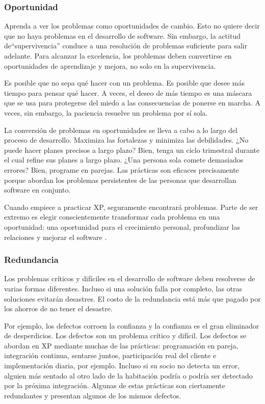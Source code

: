 \begin{spacing}{1.5}
		\subsubsection{Oportunidad}
			Aprenda a ver los problemas como oportunidades de cambio. Esto no quiere decir que no haya problemas en el desarrollo de software. Sin embargo, la actitud de``supervivencia'' conduce a una resolución de problemas suficiente para salir adelante. Para alcanzar la excelencia, los problemas deben convertirse en oportunidades de aprendizaje y mejora, no solo en la supervivencia.
			
			Es posible que no sepa qué hacer con un problema. Es posible que desee más tiempo para pensar qué hacer. A veces, el deseo de más tiempo es una máscara que se usa para protegerse del miedo a las consecuencias de ponerse en marcha. A veces, sin embargo, la paciencia resuelve un problema por sí sola.
			
			La conversión de problemas en oportunidades se lleva a cabo a lo largo del proceso de desarrollo. Maximiza las fortalezas y minimiza las debilidades. ¿No puede hacer planes precisos a largo plazo? Bien, tenga un ciclo trimestral durante el cual refine sus planes a largo plazo. ¿Una persona sola comete demasiados errores? Bien, programe en parejas. Las prácticas son eficaces precisamente porque abordan los problemas persistentes de las personas que desarrollan software en conjunto.
			
			Cuando empiece a practicar XP, seguramente encontrará problemas. Parte de ser extremo es elegir conscientemente transformar cada problema en una oportunidad: una oportunidad para el crecimiento personal, profundizar las relaciones y mejorar el software \cite{chap2_extreme_programming}.
		\subsubsection{Redundancia}
			 Los problemas críticos y difíciles en el desarrollo de software deben resolverse de varias formas diferentes. Incluso si una solución falla por completo, las otras soluciones evitarán desastres. El costo de la redundancia está más que pagado por los ahorros de no tener el desastre.
			
			Por ejemplo, los defectos corroen la confianza y la confianza es el gran eliminador de desperdicios. Los defectos son un problema crítico y difícil. Los defectos se abordan en XP mediante muchas de las prácticas: programación en pareja, integración continua, sentarse juntos, participación real del cliente e implementación diaria, por ejemplo. Incluso si su socio no detecta un error, alguien más sentado al otro lado de la habitación podría o podría ser detectado por la próxima integración. Algunas de estas prácticas son ciertamente redundantes y presentan algunos de los mismos defectos.
			

\end{spacing}
